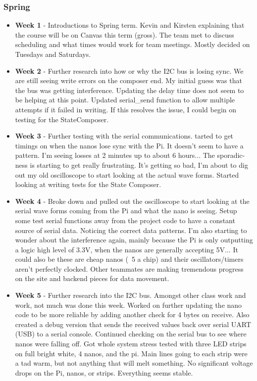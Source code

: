 \documentclass[onecolumn, draftclsnofoot,10pt, compsoc]{IEEEtran}
\begin{document}
			\subsubsection{Spring}
				\begin{itemize}
					\item \textbf{Week 1} - Introductions to Spring term. Kevin and Kirsten explaining that the course will be on Canvas this term (gross). The team met to discuss scheduling and what times would work for team meetings. Mostly decided on Tuesdays and Saturdays.
					\item \textbf{Week 2} - Further research into how or why the I2C bus is losing sync. We are still seeing write errors on the composer end. My initial guess was that the bus was getting interference. Updating the delay time does not seem to be helping at this point. Updated serial\_send function to allow multiple attempts if it failed in writing. If this resolves the issue, I could begin on testing for the StateComposer.
					\item \textbf{Week 3} - Further testing with the serial communications. tarted to get timings on when the nanos lose sync with the Pi. It doesn't seem to have a pattern. I'm seeing losses at 2 minutes up to about 6 hours... The sporadic-ness is starting to get really frustrating. It's getting so bad, I'm about to dig out my old oscilloscope to start looking at the actual wave forms. Started looking at writing tests for the State Composer.
					\item \textbf{Week 4} - Broke down and pulled out the oscilloscope to start looking at the serial wave forms coming from the Pi and what the nano is seeing. Setup some test serial functions away from the project code to have a constant source of serial data. Noticing the correct data patterns. I'm also starting to wonder about the interference again, mainly because the Pi is only outputting a logic high level of 3.3V, when the nanos are generally accepting 5V... It could also be these are cheap nanos (~5 a chip) and their oscillators/timers aren't perfectly clocked. Other teammates are making tremendous progress on the site and backend pieces for data movement.
					\item \textbf{Week 5} - Further research into the I2C bus. Amongst other class work and work, not much was done this week. Worked on further updating the nano code to be more reliable by adding another check for 4 bytes on receive. Also created a debug version that sends the received values back over serial UART (USB) to a serial console. Continued checking on the serial bus to see where nanos were falling off. Got whole system stress tested with three LED strips on full bright white, 4 nanos, and the pi. Main lines going to each strip were a tad warm, but not anything that will melt something. No significant voltage drops on the Pi, nanos, or strips. Everything seems stable.

\end{itemize}
\end{document}
